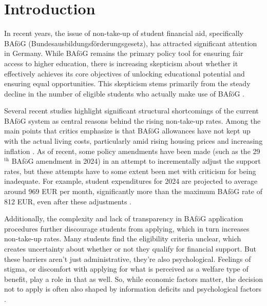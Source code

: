 %
%

\section{Introduction} \label{sec:intro}

In recent years, the issue of non-take-up of student financial aid, specifically BAföG (Bundesausbildungsförderungsgesetz), has attracted significant attention in Germany. While BAföG remains the primary policy tool for ensuring fair access to higher education, there is increasing skepticism about whether it effectively achieves its core objectives of unlocking educational potential and ensuring equal opportunities. This skepticism stems primarily from the steady decline in the number of eligible students who actually make use of BAföG \citep{gwosc_krisenbewaltigung_2022, meier_bafog_2024}.

Several recent studies highlight significant structural shortcomings of the current BAföG system as central reasons behind the rising non-take-up rates. Among the main points that critics emphasize is that BAföG allowances have not kept up with the actual living costs, particularly amid rising housing prices and increasing inflation \citep{meier_bafog_2024, meier_zur_2024, staack_von_2017, gwosc_krisenbewaltigung_2022}. As of recent, some policy amendments have been made (such as the 29\( ^{\text{th} } \) BAföG amendment in 2024) in an attempt to incrementally adjust the support rates, but these attempts have to some extent been met with criticism for being inadequate. For example, student expenditures for 2024 are projected to average around 969 EUR per month, significantly more than the maximum BAföG rate of 812 EUR, even after these adjustments \citep{meier_bafog_2024}.


Additionally, the complexity and lack of transparency in BAföG application procedures further discourage students from applying, which in turn increases non-take-up rates. Many students find the eligibility criteria unclear, which creates uncertainty about whether or not they qualify for financial support. But these barriers aren’t just administrative, they’re also psychological. Feelings of stigma, or discomfort with applying for what is perceived as a welfare type of benefit, play a role in that as well. So, while economic factors matter, the decision not to apply is often also shaped by information deficits and psychological factors \citep{gwosc_krisenbewaltigung_2022, staack_von_2017}.


